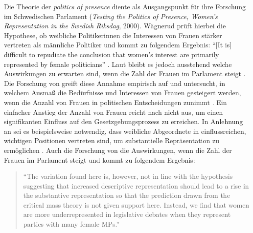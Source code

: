 \documentclass[12pt, 
    twoside=false, 
    bibliography=totoc, 
    numbers=endperiod, 
    headings=normal, 
    toc=chapterentrydotfill
    ]{scrbook}
\begin{document}
%
Die Theorie der \emph{politics of presence} \parencite{phillips_1998} diente \textcite{wangnerud_2000} als Ausgangspunkt für ihre Forschung im Schwedischen Parlament (\emph{Testing the Politics of Presence, Women's Representation in the Swedish Riksdag}, 2000). Wägnerud prüft hierbei die Hypothese, ob weibliche Politikerinnen die Interessen von Frauen stärker vertreten als männliche Politiker \parencite[84]{wangnerud_2000} und kommt zu folgendem Ergebnis: \enquote{[It is] difficult to repudiate the conclusion that women's interest are primarily represented by female politicians} \parencite[][84]{wangnerud_2000}. Laut\citeauthor{wangnerud_2000} bleibt es jedoch ausstehend welche Auswirkungen zu erwarten sind, wenn die Zahl der Frauen im Parlament steigt \parencite{wangnerud_2009}.
Die Forschung von \textcite{celis_2008} greift diese Annahme empirisch auf und untersucht, in welchem Ausmaß die Bedürfnisse und Interessen von Frauen gesteigert werden, wenn die Anzahl von Frauen in politischen Entscheidungen zunimmt \parencite[vgl. auch][4]{galligan_2016}. Ein einfacher Anstieg der Anzahl von Frauen reicht nach \textcite{celis_2008} nicht aus, um einen signifikanten Einfluss auf den Gesetzgebungsprozess zu erreichen. In Anlehnung an \textcite{caul_2001} sei es beispielsweise notwendig, dass weibliche Abgeordnete in einflussreichen, wichtigen Positionen vertreten sind, um substantielle Repräsentation zu ermöglichen \parencites{caul_2001}[vgl. auch][14]{coffe_2013}.
Auch die Forschung von \textcite{back_2018} die Auswirkungen, wenn die Zahl der Frauen im Parlament steigt und kommt zu folgendem Ergebnis: 

\citereset
\begin{quote}
  \enquote{The variation found here is, however, not in line with the hypothesis suggesting that increased descriptive representation should lead to a rise in the substantive representation so that the prediction drawn from the critical mass theory is not given support here. Instead, we find that women are more underrepresented in legislative debates when they represent parties with many female MPs.}
  \parencite[17]{back_2018}
\end{quote}
\end{document}
